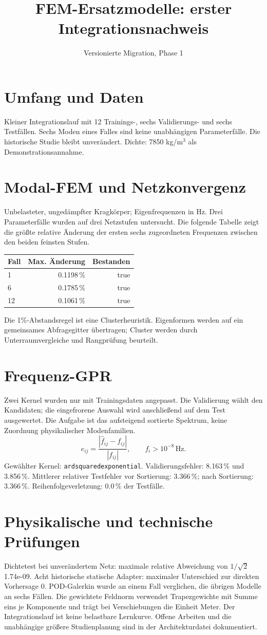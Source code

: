 \documentclass[11pt,a4paper]{article}
\title{FEM-Ersatzmodelle: erster Integrationsnachweis}
\author{Versionierte Migration, Phase 1}
\begin{document}
\maketitle
\section{Umfang und Daten}
Kleiner Integrationslauf mit 12 Trainings-, sechs Validierungs- und sechs Testfällen. Sechs Moden eines Falles sind keine unabhängigen Parameterfälle. Die historische Studie bleibt unverändert. Dichte: 7850 kg/m$^3$ als Demonstrationsannahme.
\section{Modal-FEM und Netzkonvergenz}
Unbelasteter, ungedämpfter Kragkörper; Eigenfrequenzen in Hz. Drei Parameterfälle wurden auf drei Netzstufen untersucht. Die folgende Tabelle zeigt die größte relative Änderung der ersten sechs zugeordneten Frequenzen zwischen den beiden feinsten Stufen.
\begin{center}\begin{tabular}{lrr}\toprule Fall & Max. Änderung & Bestanden \\ \midrule
1 & 0.1198\,\% & true \\
6 & 0.1785\,\% & true \\
12 & 0.1061\,\% & true \\
\bottomrule\end{tabular}\end{center}
Die 1\%-Abstandsregel ist eine Clusterheuristik. Eigenformen werden auf ein gemeinsames Abfragegitter übertragen; Cluster werden durch Unterraumvergleiche und Rangprüfung beurteilt.
\section{Frequenz-GPR}
Zwei Kernel wurden nur mit Trainingsdaten angepasst. Die Validierung wählt den Kandidaten; die eingefrorene Auswahl wird anschließend auf dem Test ausgewertet. Die Aufgabe ist das aufsteigend sortierte Spektrum, keine Zuordnung physikalischer Modenfamilien.
\[ e_{ij}=\frac{|\widehat f_{ij}-f_{ij}|}{|f_{ij}|},\qquad f_i>10^{-8}\,\mathrm{Hz}. \]
Gewählter Kernel: \texttt{ardsquaredexponential}. Validierungsfehler: 8.163\,\% und 3.856\,\%.
Mittlerer relativer Testfehler vor Sortierung: 3.366\,\%; nach Sortierung: 3.366\,\%. Reihenfolgeverletzung: 0.0\,\% der Testfälle.
\section{Physikalische und technische Prüfungen}
Dichtetest bei unverändertem Netz: maximale relative Abweichung von $1/\sqrt{2}$ 1.74e-09.
Acht historische statische Adapter: maximaler Unterschied zur direkten Vorhersage 0. POD-Galerkin wurde an einem Fall verglichen, die übrigen Modelle an sechs Fällen.
Die gewichtete Feldnorm verwendet Trapezgewichte mit Summe eins je Komponente und trägt bei Verschiebungen die Einheit Meter. Der Integrationslauf ist keine belastbare Lernkurve. Offene Arbeiten und die unabhängige größere Studienplanung sind in der Architekturdatei dokumentiert.
\end{document}

